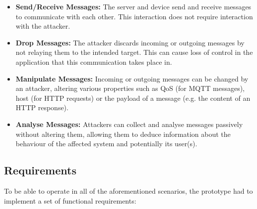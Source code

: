\begin{itemize}
    \item \textbf{Send/Receive Messages:} The server and device send and receive messages to communicate with each other. This interaction does not require interaction with the attacker.
    \item \textbf{Drop Messages:} The attacker discards incoming or outgoing messages by not relaying them to the intended target. This can cause loss of control in the application that this communication takes place in.
    \item \textbf{Manipulate Messages:} Incoming or outgoing messages can be changed by an attacker, altering various properties such as \ac{QoS} (for \ac{MQTT} messages), host (for \ac{HTTP} requests) or the payload of a message (e.g. the content of an \ac{HTTP} response).
    \item \textbf{Analyse Messages:} Attackers can collect and analyse messages passively without altering them, allowing them to deduce information about the behaviour of the affected system and potentially its user(s).
\end{itemize}

\subsection{Requirements}
To be able to operate in all of the aforementioned scenarios, the prototype had to implement a set of functional requirements:

